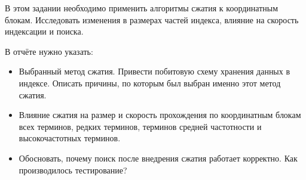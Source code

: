 \pagebreak
{}

В этом задании необходимо применить алгоритмы сжатия к координатным блокам. Исследовать изменения в размерах частей индекса, влияние на скорость индексации и поиска.

В отчёте нужно указать:
\begin{itemize}
    \item Выбранный метод сжатия. Привести побитовую схему хранения данных в индексе. Описать причины, по которым был выбран именно этот метод сжатия.
    \item Влияние сжатия на размер и скорость прохождения по координатным блокам всех терминов, редких терминов, терминов средней частотности и высокочастотных терминов.
    \item Обосновать, почему поиск после внедрения сжатия работает корректно. Как производилось тестирование?
\end{itemize}
